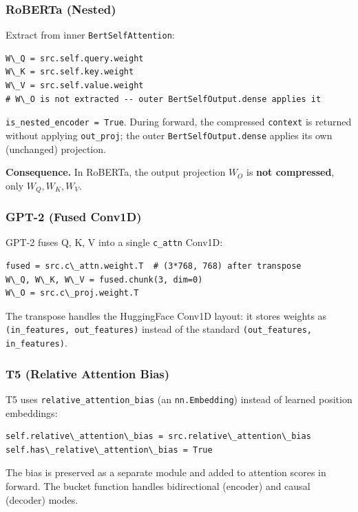 \subsubsection{RoBERTa (Nested)}

Extract from inner \texttt{BertSelfAttention}:

\begin{lstlisting}
W\_Q = src.self.query.weight
W\_K = src.self.key.weight
W\_V = src.self.value.weight
# W\_O is not extracted -- outer BertSelfOutput.dense applies it
\end{lstlisting}

\texttt{is\_nested\_encoder = True}. During forward, the compressed \texttt{context} is 
returned without applying \texttt{out\_proj}; the outer \texttt{BertSelfOutput.dense} 
applies its own (unchanged) projection.

\textbf{Consequence.} In RoBERTa, the output projection $W_O$ is \textbf{not compressed}, 
only $W_Q, W_K, W_V$.

\subsubsection{GPT-2 (Fused Conv1D)}

GPT-2 fuses Q, K, V into a single \texttt{c\_attn} Conv1D:

\begin{lstlisting}
fused = src.c\_attn.weight.T  # (3*768, 768) after transpose
W\_Q, W\_K, W\_V = fused.chunk(3, dim=0)
W\_O = src.c\_proj.weight.T
\end{lstlisting}

The transpose handles the HuggingFace Conv1D layout: it stores weights as 
\texttt{(in\_features, out\_features)} instead of the standard \texttt{(out\_features, in\_features)}.

\subsubsection{T5 (Relative Attention Bias)}

T5 uses \texttt{relative\_attention\_bias} (an \texttt{nn.Embedding}) instead of learned 
position embeddings:

\begin{lstlisting}
self.relative\_attention\_bias = src.relative\_attention\_bias
self.has\_relative\_attention\_bias = True
\end{lstlisting}

The bias is preserved as a separate module and added to attention scores 
in forward. The bucket function handles bidirectional (encoder) and causal 
(decoder) modes.

